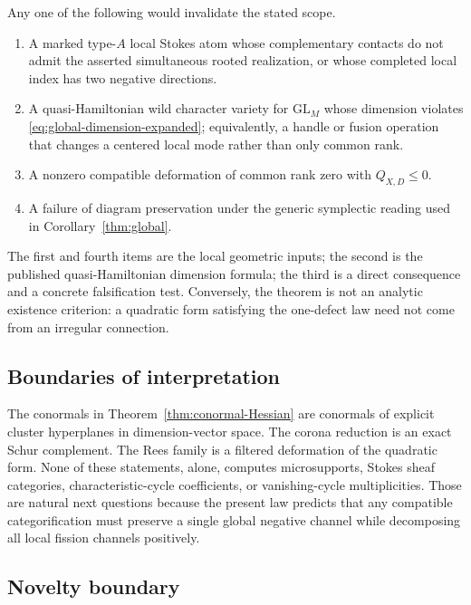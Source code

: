 \documentclass[11pt,a4paper]{amsart}
\theoremstyle{plain}
\theoremstyle{definition}
\begin{document}
Any one of the following would invalidate the stated scope.
\begin{enumerate}[label=(\arabic*),leftmargin=2.2em]
\item A marked type-$A$ local Stokes atom whose complementary contacts do not admit the asserted
simultaneous rooted realization, or whose completed local index has two negative directions.
\item A quasi-Hamiltonian wild character variety for $\mathrm{GL}_M$ whose dimension violates
\eqref{eq:global-dimension-expanded}; equivalently, a handle or fusion operation that changes a
centered local mode rather than only common rank.
\item A nonzero compatible deformation of common rank zero with
$Q_{X,D}\le0$.
\item A failure of diagram preservation under the generic symplectic reading used in
Corollary~\ref{thm:global}.
\end{enumerate}
The first and fourth items are the local geometric inputs; the second is the published
quasi-Hamiltonian dimension formula; the third is a direct consequence and a concrete falsification
test.  Conversely, the theorem is not an analytic existence criterion: a quadratic form satisfying
the one-defect law need not come from an irregular connection.

\subsection{Boundaries of interpretation}

The conormals in Theorem~\ref{thm:conormal-Hessian} are conormals of explicit cluster hyperplanes in
dimension-vector space.  The corona reduction is an exact Schur complement.  The Rees family is a
filtered deformation of the quadratic form.  None of these statements, alone, computes
microsupports, Stokes sheaf categories, characteristic-cycle coefficients, or vanishing-cycle
multiplicities.  Those are natural next questions because the present law predicts that any
compatible categorification must preserve a single global negative channel while decomposing all
local fission channels positively.

\subsection{Novelty boundary}
\end{document}
